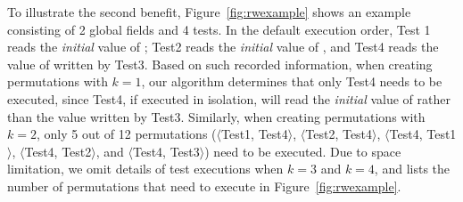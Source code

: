 To illustrate the second benefit, Figure~\ref{fig:rwexample}
shows an example
consisting of 2 global fields and 4 tests. In the default execution
order, Test 1 reads the \textit{initial} value of ;
Test2 reads the \textit{initial} value of , and Test4
reads the value of  written by Test3.
Based on such recorded information, when creating permutations with $k=1$,
our algorithm determines that only
Test4 needs to be executed, since Test4, if executed in isolation,
will read the \textit{initial} value of  rather than the 
value written by Test3. Similarly, when creating permutations with $k=2$,
only 5 out of 12 permutations ($\langle$Test1, Test4$\rangle$,
$\langle$Test2, Test4$\rangle$, $\langle$Test4, Test1$\rangle$,
$\langle$Test4, Test2$\rangle$, and $\langle$Test4, Test3$\rangle$) need to be executed.
Due to space limitation, we omit details of test executions when
$k=3$ and $k=4$, and lists the number of permutations that need
to execute in Figure~\ref{fig:rwexample}.








